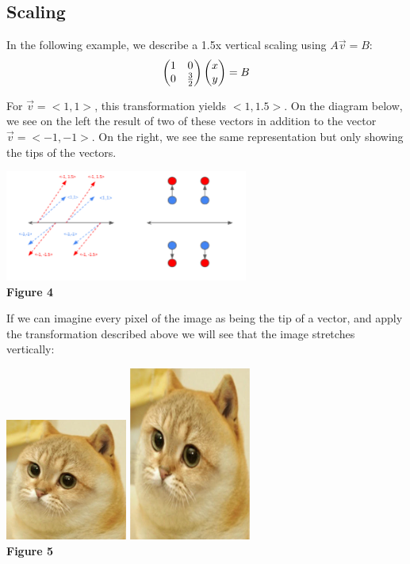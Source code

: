 \documentclass{article}
\begin{document}
\subsection{Scaling}
\par \noindent In the following example, we describe a 1.5x vertical scaling using \(A\vec{v} = B\):
\[
\left(\begin{array}{@{}cc@{}}
	1 & 0 \\
	0 & \frac{3}{2} \\
\end{array}\right)
\left(\begin{array}{@{}c@{}}
	x \\
	y \\
\end{array}\right)= B
\]
\par \noindent For \( \vec v = <1,1>\), this transformation yields \(<1,1.5>\). On the diagram below, we see on the left the result of two of these vectors in addition to the vector \(\vec v=<-1,-1>\). On the right, we see the same representation but only showing the tips of the vectors.

\begin{center}
	\includegraphics[width=8cm]{scale.png}\\
	\textbf{Figure 4}
\end{center}

\par\noindent If we can imagine every pixel of the image as being the tip of a vector, and apply the transformation described above we will see that the image stretches vertically:

\begin{center}
	\includegraphics[width=4cm]{cate-original.jpg}
	\includegraphics[width=4cm]{cate-scaled.jpg}\\
	\textbf{Figure 5}
\end{center}
\end{document}

